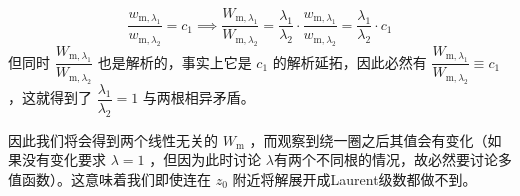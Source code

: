 \begin{tcolorbox}[colback=gray!20,colframe=gray!150,fonttitle=\bfseries,arc=0mm,leftrule=1mm,toprule=0mm,bottomrule=0mm,rightrule=0mm,breakable]
\begin{itemize}
		      \[
			      \dfrac{w_{\mathrm m,\lambda_1}}{w_{\mathrm m,\lambda _2}}=c_1 \implies \dfrac{W_{\mathrm m,\lambda_1}}{W_{\mathrm m,\lambda _2}} = \dfrac{\lambda_1 }{\lambda _2}\cdot\dfrac{w_{\mathrm m,\lambda_1}}{w_{\mathrm m,\lambda _2}} = \dfrac{\lambda_1 }{\lambda _2}\cdot c_1
		      \]
		      但同时 \(\dfrac{W_{\mathrm m,\lambda_1}}{W_{\mathrm m,\lambda _2}} \) 也是解析的，事实上它是 \(c_1\) 的解析延拓，因此必然有 \(\dfrac{W_{\mathrm m,\lambda_1}}{W_{\mathrm m,\lambda _2}}\equiv c_1\)，这就得到了 \( \dfrac{\lambda_1}{\lambda _2}=1\) 与两根相异矛盾。

		      因此我们将会得到两个线性无关的 \(W_{\mathrm{m}}\) ，而观察到绕一圈之后其值会有变化（如果没有变化要求 \(\lambda =1\) ，但因为此时讨论 \(\lambda \)有两个不同根的情况，故必然要讨论多值函数）。这意味着我们即使连在 \(z_0 \) 附近将解展开成Laurent级数都做不到。


\end{itemize}
\end{tcolorbox}

